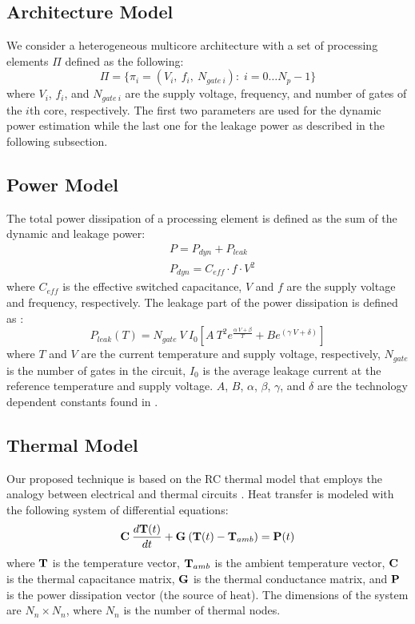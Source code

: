 \subsection{Architecture Model} \label{sec:architecture-model}
We consider a heterogeneous multicore architecture with a set of processing elements $\Pi$ defined as the following:
\[
  \Pi = \{ \pi_i = (V_i, \: f_i, \: N_{gate \: i}): \; i = 0 \dots N_p - 1 \}
\]
where $V_i$, $f_i$, and $N_{gate \: i}$ are the supply voltage, frequency, and number of gates \cite{liao2005} of the $i$th core, respectively. The first two parameters are used for the dynamic power estimation while the last one for the leakage power as described in the following subsection.

\subsection{Power Model} \label{sec:power-model}
The total power dissipation of a processing element is defined as the sum of the dynamic and leakage power:
\begin{align*}
  & P = P_{dyn} + P_{leak} \\
  & P_{dyn} = C_{eff} \cdot f \cdot V^2
\end{align*}
where $C_{eff}$ is the effective switched capacitance, $V$ and $f$ are the supply voltage and frequency, respectively. The leakage part of the power dissipation is defined as \cite{liao2005}:
\[
  P_{leak}(T) = N_{gate} \: V \: I_0 \left[ A \: T^2 e^{\frac{\alpha \: V + \beta}{T}} + B e^{(\gamma \: V + \delta)} \right]
\]
where $T$ and $V$ are the current temperature and supply voltage, respectively, $N_{gate}$ is the number of gates in the circuit, $I_0$ is the average leakage current at the reference temperature and supply voltage. $A$, $B$, $\alpha$, $\beta$, $\gamma$, and $\delta$ are the technology dependent constants found in \cite{liao2005}.

\subsection{Thermal Model} \label{sec:thermal-model}
Our proposed technique is based on the RC thermal model that employs the analogy between electrical and thermal circuits \cite{kreith2000}. Heat transfer is modeled with the following system of differential equations:
\begin{equation} \label{eq:fourier-model}
  \mathbf{C} \: \frac{d\mathbf{T}(t)}{dt} + \mathbf{G} \: (\mathbf{T}(t) - \mathbf{T}_{amb})= \mathbf{P}(t)
\end{equation}
where $\mathbf{T}$ is the temperature vector, $\mathbf{T}_{amb}$ is the ambient temperature vector, $\mathbf{C}$ is the thermal capacitance matrix, $\mathbf{G}$ is the thermal conductance matrix, and $\mathbf{P}$ is the power dissipation vector (the source of heat). The dimensions of the system are $N_n \times N_n$, where $N_n$ is the number of thermal nodes.


